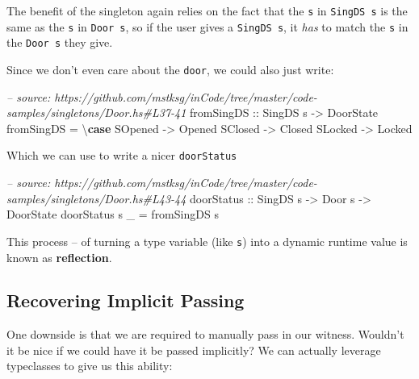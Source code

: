 \documentclass[]{article}
\newenvironment{Shaded}{}{}
\newcommand{\KeywordTok}[1]{\textcolor[rgb]{0.00,0.44,0.13}{\textbf{#1}}}
\newcommand{\DataTypeTok}[1]{\textcolor[rgb]{0.56,0.13,0.00}{#1}}
\newcommand{\CommentTok}[1]{\textcolor[rgb]{0.38,0.63,0.69}{\textit{#1}}}
\newcommand{\OtherTok}[1]{\textcolor[rgb]{0.00,0.44,0.13}{#1}}
\newcommand{\FunctionTok}[1]{\textcolor[rgb]{0.02,0.16,0.49}{#1}}
\newcommand{\NormalTok}[1]{#1}
\begin{document}
The benefit of the singleton again relies on the fact that the \texttt{s} in
\texttt{SingDS\ s} is the same as the \texttt{s} in \texttt{Door\ s}, so if the
user gives a \texttt{SingDS\ s}, it \emph{has} to match the \texttt{s} in the
\texttt{Door\ s} they give.

Since we don't even care about the \texttt{door}, we could also just write:

\begin{Shaded}
\begin{Highlighting}[]
\CommentTok{-- source: https://github.com/mstksg/inCode/tree/master/code-samples/singletons/Door.hs#L37-41}
\OtherTok{fromSingDS ::} \DataTypeTok{SingDS}\NormalTok{ s }\OtherTok{->} \DataTypeTok{DoorState}
\NormalTok{fromSingDS }\FunctionTok{=}\NormalTok{ \textbackslash{}}\KeywordTok{case}
    \DataTypeTok{SOpened} \OtherTok{->} \DataTypeTok{Opened}
    \DataTypeTok{SClosed} \OtherTok{->} \DataTypeTok{Closed}
    \DataTypeTok{SLocked} \OtherTok{->} \DataTypeTok{Locked}
\end{Highlighting}
\end{Shaded}

Which we can use to write a nicer \texttt{doorStatus}

\begin{Shaded}
\begin{Highlighting}[]
\CommentTok{-- source: https://github.com/mstksg/inCode/tree/master/code-samples/singletons/Door.hs#L43-44}
\OtherTok{doorStatus ::} \DataTypeTok{SingDS}\NormalTok{ s }\OtherTok{->} \DataTypeTok{Door}\NormalTok{ s }\OtherTok{->} \DataTypeTok{DoorState}
\NormalTok{doorStatus s _ }\FunctionTok{=}\NormalTok{ fromSingDS s}
\end{Highlighting}
\end{Shaded}

This process -- of turning a type variable (like \texttt{s}) into a dynamic
runtime value is known as \textbf{reflection}.

\subsection{Recovering Implicit Passing}\label{recovering-implicit-passing}

One downside is that we are required to manually pass in our witness. Wouldn't
it be nice if we could have it be passed implicitly? We can actually leverage
typeclasses to give us this ability:
\end{document}
